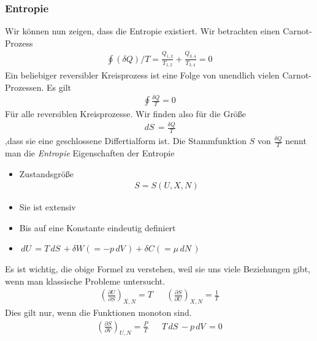 \documentclass[11pt]{article}
\theoremstyle{plain}
\theoremstyle{mytheoremstyle}
\newcommand{\pd}[2]{\frac{\partial #1 }{\partial #2}}
\renewcommand{\d}[1]{\,d#1\,}
\begin{document}
\subsubsection*{Entropie}
Wir können nun zeigen, dass die Entropie existiert.
Wir betrachten einen Carnot-Prozess
%
\begin{align*}
  \oint (\delta Q)/T =\frac{Q_{1,2}}{T_{1,2}} +\frac{Q_{3,4}}{T_{3,4}} = 0
\end{align*}
%
Ein beliebiger reversibler Kreisprozess ist eine Folge von unendlich vielen
Carnot-Prozessen.
%
Es gilt
\begin{align*}
  \oint
\frac{\delta Q}{T} = 0 
\end{align*}
%
Für alle reversiblen Kreisprozesse. Wir finden also für die Größe
%
\begin{align*}
  \d{S} =\frac{\delta Q}{T} 
\end{align*}
,dass sie eine geschlossene Differtialform ist.
Die Stammfunktion $S$ von $\frac{\delta Q}{T}$ nennt man die \emph{Entropie}
Eigenschaften der Entropie
\begin{itemize}
  \item Zustandsgröße
    \begin{align*}
      S = S (U, X, N)
    \end{align*}
  \item Sie ist extensiv
  \item Bis auf eine Konstante eindeutig definiert
  \item $ \d{U} = T \d{S} + \delta W(=-p \d{V}) + \delta C (=\mu \d{N})$

\end{itemize}
    Es ist wichtig, die obige Formel zu verstehen, weil sie uns viele Beziehungen
    gibt, wenn man klassische Probleme untersucht.
%
\begin{align*}
  \left( \pd{U}{S} \right)_{X, N} = T && \left( \pd{S}{U} \right)_{X, N} =\frac{1}{T}
\end{align*}
%
Dies gilt nur, wenn die Funktionen monoton sind.
%
\begin{align*}
  \left( \pd{S}{V} \right)_{U, N} =\frac{P}{T} && T \d{S} - p \d{V} = 0
\end{align*}
%
\end{document}
